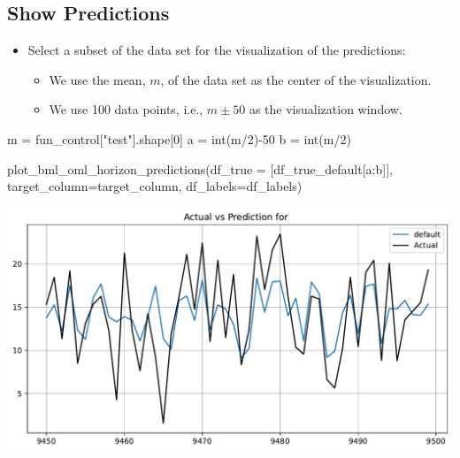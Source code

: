 \documentclass[
  letterpaper,
  DIV=11,
  numbers=noendperiod]{scrreprt}
\newenvironment{Shaded}{\begin{snugshade}}{\end{snugshade}}
\newcommand{\BuiltInTok}[1]{\textcolor[rgb]{0.00,0.23,0.31}{#1}}
\newcommand{\DecValTok}[1]{\textcolor[rgb]{0.68,0.00,0.00}{#1}}
\newcommand{\NormalTok}[1]{\textcolor[rgb]{0.00,0.23,0.31}{#1}}
\newcommand{\OperatorTok}[1]{\textcolor[rgb]{0.37,0.37,0.37}{#1}}
\newcommand{\StringTok}[1]{\textcolor[rgb]{0.13,0.47,0.30}{#1}}
\providecommand{\tightlist}{%
  \setlength{\itemsep}{0pt}\setlength{\parskip}{0pt}}\usepackage{longtable,booktabs,array}
\begin{document}
\subsection{Show Predictions}\label{show-predictions}

\begin{itemize}
\tightlist
\item
  Select a subset of the data set for the visualization of the
  predictions:

  \begin{itemize}
  \tightlist
  \item
    We use the mean, \(m\), of the data set as the center of the
    visualization.
  \item
    We use 100 data points, i.e., \(m \pm 50\) as the visualization
    window.
  \end{itemize}
\end{itemize}

\begin{Shaded}
\begin{Highlighting}[]
\NormalTok{m }\OperatorTok{=}\NormalTok{ fun\_control[}\StringTok{"test"}\NormalTok{].shape[}\DecValTok{0}\NormalTok{]}
\NormalTok{a }\OperatorTok{=} \BuiltInTok{int}\NormalTok{(m}\OperatorTok{/}\DecValTok{2}\NormalTok{)}\OperatorTok{{-}}\DecValTok{50}
\NormalTok{b }\OperatorTok{=} \BuiltInTok{int}\NormalTok{(m}\OperatorTok{/}\DecValTok{2}\NormalTok{)}
\end{Highlighting}
\end{Shaded}

\begin{Shaded}
\begin{Highlighting}[]
\NormalTok{plot\_bml\_oml\_horizon\_predictions(df\_true }\OperatorTok{=}\NormalTok{ [df\_true\_default[a:b]], target\_column}\OperatorTok{=}\NormalTok{target\_column,  df\_labels}\OperatorTok{=}\NormalTok{df\_labels)}
\end{Highlighting}
\end{Shaded}

\includegraphics{025_spot_hpt_river_friedman_amfr_files/figure-pdf/cell-30-output-1.pdf}
\end{document}
